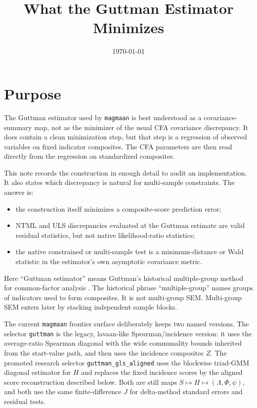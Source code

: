 \documentclass[11pt]{article}
\title{What the Guttman Estimator Minimizes}
\author{}
\date{\today}
\theoremstyle{plain}
\theoremstyle{remark}
\begin{document}
\maketitle

\section*{Purpose}

The Guttman estimator used by \texttt{magmaan} is best understood as a
covariance-summary map, not as the minimizer of the usual CFA covariance
discrepancy. It does contain a clean minimization step, but that step is a
regression of observed variables on fixed indicator composites. The CFA
parameters are then read directly from the regression on standardized
composites.

This note records the construction in enough detail to audit an implementation.
It also states which discrepancy is natural for multi-sample constraints. The
answer is:
\begin{itemize}
\item the construction itself minimizes a composite-score prediction error;
\item NTML and ULS discrepancies evaluated at the Guttman estimate are valid
  residual statistics, but not native likelihood-ratio statistics;
\item the native constrained or multi-sample test is a minimum-distance or Wald
  statistic in the estimator's own asymptotic covariance metric.
\end{itemize}

Here ``Guttman estimator'' means Guttman's historical multiple-group method for
common-factor analysis \cite{guttman1952}. The historical phrase
``multiple-group'' names groups of indicators used to form composites. It is not
multi-group SEM. Multi-group SEM enters later by stacking independent sample
blocks.

The current \texttt{magmaan} frontier surface deliberately keeps two named
versions. The selector \texttt{guttman} is the legacy, lavaan-like
Spearman/incidence version: it uses the average-ratio Spearman diagonal with the
wide communality bounds inherited from the start-value path, and then uses the
incidence composites \(Z\). The promoted research selector
\texttt{guttman\_gls\_aligned} uses the blockwise triad-GMM diagonal estimator
for \(H\) and replaces the fixed incidence scores by the aligned score
reconstruction described below. Both are still maps
\(S\mapsto H\mapsto(\Lambda,\Phi,\psi)\), and both use the same
finite-difference \(J\) for delta-method standard errors and residual tests.
\end{document}
